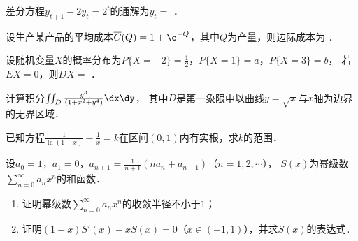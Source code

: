 \documentclass[plain,noanswer,medmath]{../../template/jnuexam}
\begin{document}
\begin{problem}
差分方程$y_{t + 1} - 2y_t = 2^t$的通解为$y_t =$ \fillin{}．
\end{problem}


\begin{problem}
设生产某产品的平均成本$\overline{C} (Q) = 1 + \e^{- Q}$，其中$Q$为产量，则边际成本为 \fillin{}．
\end{problem}






\begin{problem}
设随机变量$X$的概率分布为$P\{X = - 2\} = \frac{1}{2}$，$P\{X = 1\} = a$，$P\{X = 3\} = b$，
若$EX = 0$，则$DX =$ \fillin{}．
\end{problem}






\begin{problem}[points=10]
计算积分$\iint_D \frac{y^3}{(1 + x^2 + y^4)} \dx\dy$，
其中$D$是第一象限中以曲线$y = \sqrt{x}$与$x$轴为边界的无界区域．
\end{problem}




\begin{problem}[points=10]
已知方程$\frac{1}{\ln(1 + x)} - \frac{1}{x} = k$在区间$(0,1)$内有实根，求$k$的范围．
\end{problem}


\begin{problem}[points=10]
设$a_0 = 1$，$a_1 = 0$，$a_{n + 1} = \frac{1}{n + 1}(na_n + a_{n - 1})$（$n = 1,2, \cdots$），
$S(x)$为幂级数$\sum_{n = 0}^{\infty}a_n x^n$的和函数．
\begin{enumerate}
\item 证明幂级数$\sum_{n = 0}^{\infty}a_n x^n$的收敛半径不小于$1$；
\item 证明$(1 - x)S'(x) - xS(x) = 0$（$x \in(- 1,1)$），并求$S(x)$的表达式．
\end{enumerate}
\end{problem}








\end{document}
